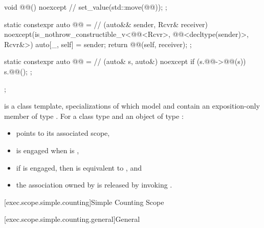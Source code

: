 \begin{codeblock}
{{{      void @@() noexcept {     // \expos
        set_value(std::move(@@));
      }
    };

    static constexpr auto @@ =       // (auto&& sender, Rcvr& receiver)
        noexcept(is_nothrow_constructible_v<@@<Rcvr>, @@<decltype(sender)>, Rcvr&>) {
        auto[_, self] = sender;
        return @@(self, receiver);
      };

    static constexpr auto @@ =           // \expos
      [](auto& s, auto&) noexcept {
        if (s.@@->@@(s))
          s.@@();
      };
  };
}
\end{codeblock}

\pnum
{} is a class template,
specializations of which model  and
contain an exposition-only member  of type .
For a class type  and
an object  of type :
\begin{itemize}
\item
{} points to its associated scope,
\item
{} is engaged when  is ,
\item
if  is engaged,
then  is equivalent to
, and
\item
the association owned by 
is released by invoking .
\end{itemize}

[exec.scope.simple.counting]{Simple Counting Scope}

[exec.scope.simple.counting.general]{General}

